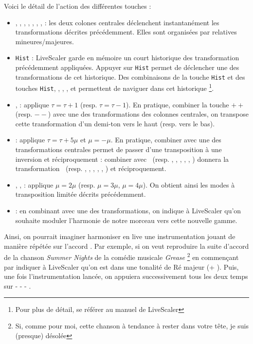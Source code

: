 Voici le détail de l'action des différentes touches : 
\begin{itemize}
  \item \LSI, \LSvi, \LSIV, \LSII, \LSV, \LSiii, \LSII, \LSvii :  les deux colones centrales déclenchent instantanément les transformations décrites précédemment. Elles sont organisées par relatives mineures/majeures.
  \item  \texttt{Hist} : LiveScaler garde en mémoire un court historique des transformation précédemment appliquées. Appuyer sur \texttt{Hist} permet de déclencher une des transformations de cet historique. Des combinaisons de la touche \texttt{Hist} et des touches \texttt{Hist}, \LSMm, \LStwo, \LSthree, et \LSfour permettent de naviguer dans cet historique \footnote{Pour plus de détail, se référer au manuel de LiveScaler}. 
  \item \LSpp, \LSmm : applique  $\tau = \tau + 1$ (resp. $\tau = \tau - 1$). En pratique, combiner la touche $++$ (resp. $--$) avec une des transformations des colonnes centrales, on transpose cette transformation d'un demi-ton vers le haut (resp. vers le bas). 
  \item  \LSMm : applique $\tau = \tau + 5\mu $ et $\mu = -\mu$.  En pratique, combiner \LSMm avec une des transformations centrales permet de passer d'une transposition à une inversion et réciproquement : combiner \LSMm avec \LSI $~$ (resp. \LSii, \LSiii, \LSIV, \LSV, \LSvi, \LSvii) donnera la transformation \LSi $~$ (resp.  \LSII, \LSIII, \LSiv, \LSv, \LSVI, \LSVII) et réciproquement. 
  \item \LStwo, \LSthree, \LSfour : applique $\mu = 2\mu$ (resp. $\mu = 3\mu$, $\mu = 4\mu$). On obtient ainsi les modes à transposition limitée décrits précédemment.
  \item \LSMod : en combinant \LSMod avec une des transformations, on indique à LiveScaler qu'on souhaite moduler l'harmonie de notre morceau vers cette nouvelle gamme. 
\end{itemize}

Ainsi, on pourrait imaginer harmoniser en live une instrumentation jouant de manière répétée sur l'accord . Par exemple, si on veut reproduire la suite d'accord de la chanson \emph{Summer Nights} de la comédie musicale \emph{Grease} \footnote{Si, comme pour moi, cette chanson à tendance à rester dans votre tête, je suis (presque) désolée} en commençant par indiquer à LiveScaler qu'on est dans une tonalité de Ré majeur (\LSMod + \LSII). Puis, une fois l'instrumentation lancée, on appuiera successivement tous les deux temps sur  \LSI - \LSIV - \LSV - \LSIV.

